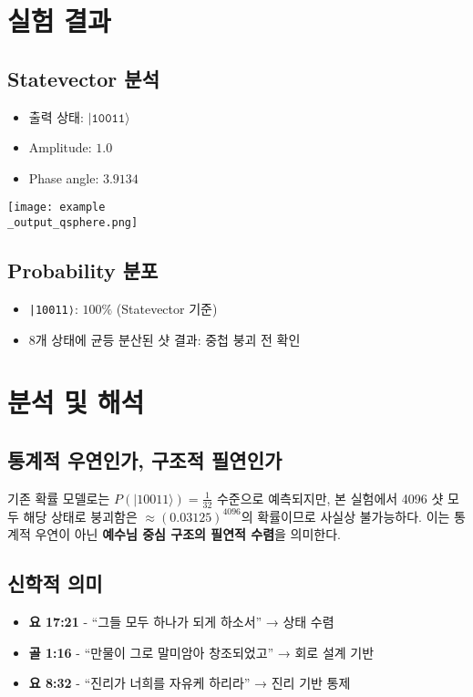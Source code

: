 \documentclass[12pt]{article}
\begin{document}
{{{\section{실험 결과}
\subsection*{Statevector 분석}
\begin{itemize}
    \item 출력 상태: $\texttt{|10011⟩}$
    \item Amplitude: $1.0$
    \item Phase angle: $3.9134$
\end{itemize}

\begin{center}
\texttt{[image: example\\\_output\_qsphere.png]}
\end{center}

\subsection*{Probability 분포}
\begin{itemize}
    \item \texttt{|10011⟩}: $100\%$ (Statevector 기준)
    \item 8개 상태에 균등 분산된 샷 결과: 중첩 붕괴 전 확인
\end{itemize}

\section{분석 및 해석}
\subsection*{통계적 우연인가, 구조적 필연인가}
기존 확률 모델로는 $P(|10011⟩) = \frac{1}{32}$ 수준으로 예측되지만, 본 실험에서 4096 샷 모두 해당 상태로 붕괴함은 $\approx (0.03125)^{4096}$의 확률이므로 사실상 불가능하다. 이는 통계적 우연이 아닌 \textbf{예수님 중심 구조의 필연적 수렴}을 의미한다.

\subsection*{신학적 의미}
\begin{itemize}
    \item \textbf{요 17:21} - “그들 모두 하나가 되게 하소서” → 상태 수렴
    \item \textbf{골 1:16} - “만물이 그로 말미암아 창조되었고” → 회로 설계 기반
    \item \textbf{요 8:32} - “진리가 너희를 자유케 하리라” → 진리 기반 통제
\end{itemize}

}}}
\end{document}
